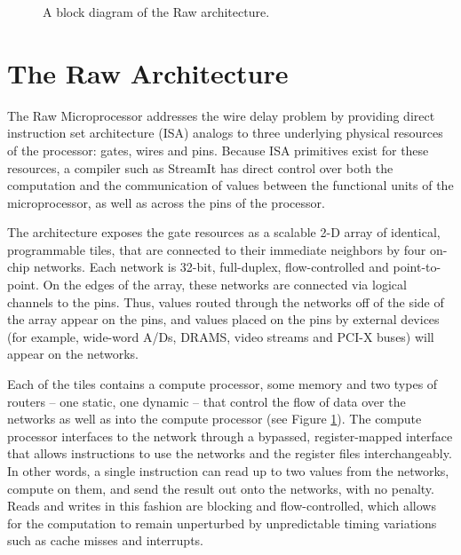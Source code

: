 \begin{figure}
\centering
{}
\caption{A block diagram of the Raw architecture.
\protect\label{fig:raw-diagram}}
\end{figure}

\section{The Raw Architecture}
\label{sec:raw}

The Raw Microprocessor \cite{raw10,raw} addresses the wire delay
problem \cite{raw13} by providing direct instruction set architecture
(ISA) analogs to three underlying physical resources of the processor:
gates, wires and pins. Because ISA primitives exist for these
resources, a compiler such as StreamIt has direct control over both
the computation and the communication of values between the functional
units of the microprocessor, as well as across the pins of the
processor.

The architecture exposes the gate resources as a scalable 2-D array of
identical, programmable tiles, that are connected to their immediate
neighbors by four on-chip networks.  Each network is 32-bit,
full-duplex, flow-controlled and point-to-point. On the edges of the
array, these networks are connected via logical channels \cite{raw11}
to the pins.  Thus, values routed through the networks off of the side
of the array appear on the pins, and values placed on the pins by
external devices (for example, wide-word A/Ds, DRAMS, video streams
and PCI-X buses) will appear on the networks.

Each of the tiles contains a compute processor, some memory and two
types of routers -- one static, one dynamic -- that control the flow
of data over the networks as well as into the compute processor (see
Figure \ref{fig:raw-diagram}). The compute processor interfaces to the
network through a bypassed, register-mapped interface \cite{raw10}
that allows instructions to use the networks and the register files
interchangeably. In other words, a single instruction can read up to
two values from the networks, compute on them, and send the result out
onto the networks, with no penalty.  Reads and writes in this fashion
are blocking and flow-controlled, which allows for the computation to
remain unperturbed by unpredictable timing variations such as cache
misses and interrupts.

